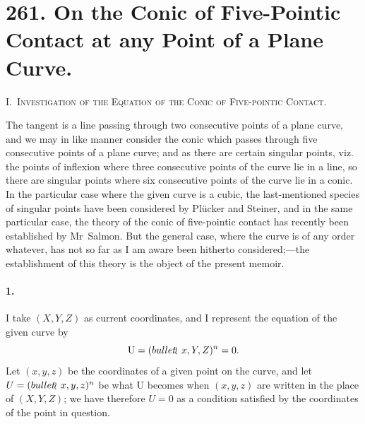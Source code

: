\documentclass[11pt,a4paper]{book}
\begin{document}
\newpage
\section*{261. On the Conic of Five-Pointic Contact at any Point of a Plane Curve.}
\label{sec:paper261}


\medskip

\noindent\textsc{I.~Investigation of the Equation of the Conic of Five-pointic Contact.}

\medskip

The  tangent  is  a  line  passing  through  two  consecutive  points  of  a  plane  curve,
and  we  may  in  like  manner  consider  the  conic  which  passes  through  five  consecutive
points  of  a  plane  curve;  and  as  there  are  certain  singular  points,  viz.  the  points  of
inflexion  where  three  consecutive  points  of  the  curve  lie  in  a  line,  so  there  are
singular  points  where  six  consecutive  points  of  the  curve  lie  in  a  conic.  In  the
particular  case  where  the  given  curve  is  a  cubic,  the  last-mentioned  species  of  singular
points  have  been  considered  by  Pl\"ucker  and  Steiner,  and  in  the  same  particular  case,
the  theory  of  the  conic  of  five-pointic  contact  has  recently  been  established  by  Mr~Salmon.
But  the  general  case,  where  the  curve  is  of  any  order  whatever,  has  not  so  far  as
I  am  aware  been  hitherto  considered;---the  establishment  of  this  theory  is  the  object
of  the  present  memoir.

\paragraph{1.}
I  take  $(X, Y, Z)$  as  current  coordinates,  and  I  represent  the  equation  of  the
given  curve  by
\[
\mathrm{U} = (\\bullet\!\!\wr\, x, Y, Z)^n = 0.
\]
Let  $(x, y, z)$  be  the  coordinates  of  a  given  point  on  the  curve,  and  let  $U = (\\bullet\!\!\wr\, x, y, z)^n$
be  what  $\mathrm{U}$  becomes  when  $(x, y, z)$  are  written  in  the  place  of  $(X, Y, Z)$;  we  have
therefore  $U = 0$  as  a  condition  satisfied  by  the  coordinates  of  the  point  in  question.
\end{document}
